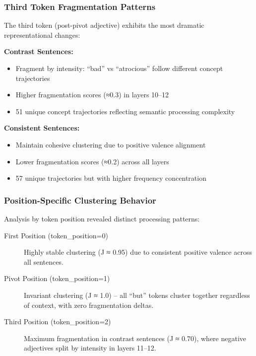 \subsubsection{Third Token Fragmentation Patterns}

The third token (post-pivot adjective) exhibits the most dramatic representational changes:

\textbf{Contrast Sentences:}
\begin{itemize}
    \item Fragment by intensity: ``bad'' vs ``atrocious'' follow different concept trajectories
    \item Higher fragmentation scores (≈0.3) in layers 10--12
    \item 51 unique concept trajectories reflecting semantic processing complexity
\end{itemize}

\textbf{Consistent Sentences:}
\begin{itemize}
    \item Maintain cohesive clustering due to positive valence alignment
    \item Lower fragmentation scores (≈0.2) across all layers  
    \item 57 unique trajectories but with higher frequency concentration
\end{itemize}

\subsubsection{Position-Specific Clustering Behavior}

Analysis by token position revealed distinct processing patterns:

\begin{description}
    \item[First Position (token\_position=0)] Highly stable clustering (J ≈ 0.95) due to consistent positive valence across all sentences.
    
    \item[Pivot Position (token\_position=1)] Invariant clustering (J ≈ 1.0) -- all ``but'' tokens cluster together regardless of context, with zero fragmentation deltas.
    
    \item[Third Position (token\_position=2)] Maximum fragmentation in contrast sentences (J ≈ 0.70), where negative adjectives split by intensity in layers 11--12.
\end{description}

